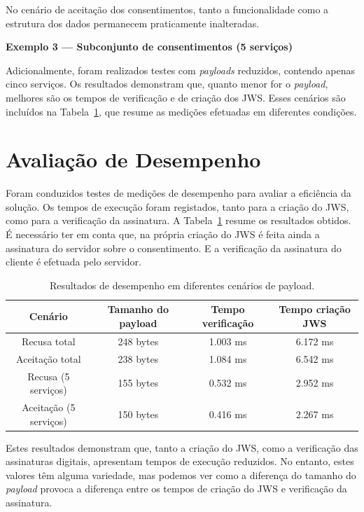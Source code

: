 No cenário de aceitação dos consentimentos, tanto a funcionalidade como a estrutura dos dados permanecem praticamente inalteradas.

\textbf{Exemplo 3 — Subconjunto de consentimentos (5 serviços)}

Adicionalmente, foram realizados testes com \textit{payloads} reduzidos, contendo apenas cinco serviços.
Os resultados demonstram que, quanto menor for o \textit{payload}, melhores são os tempos de verificação e de criação dos JWS.
Esses cenários são incluídos na Tabela~\ref{tab:performance}, que resume as medições efetuadas em diferentes condições.

\section{Avaliação de Desempenho}

Foram conduzidos testes de medições de desempenho para avaliar a eficiência da solução. Os tempos de execução foram registados, tanto para a criação do JWS, como para a verificação da assinatura. A Tabela~\ref{tab:performance} resume os resultados obtidos.
É necessário ter em conta que, na própria criação do JWS é feita ainda a assinatura do servidor sobre o consentimento. E a verificação da assinatura do cliente é efetuada pelo servidor.

\begin{table}[h]
    \centering
    \caption{Resultados de desempenho em diferentes cenários de payload.}
    \label{tab:performance}
    \begin{tabular}{|c|c|c|c|}
        \hline
        \textbf{Cenário} & \textbf{Tamanho do payload} & \textbf{Tempo verificação} & \textbf{Tempo criação JWS} \\ \hline
        Recusa total   & 248 bytes & 1.003 ms & 6.172 ms \\ \hline
        Aceitação total & 238 bytes & 1.084 ms & 6.542 ms \\ \hline
        Recusa (5 serviços) & 155 bytes & 0.532 ms & 2.952 ms \\ \hline
        Aceitação (5 serviços) & 150 bytes & 0.416 ms & 2.267 ms \\ \hline
    \end{tabular}
\end{table}

Estes resultados demonstram que, tanto a criação do JWS, como a verificação das assinaturas digitais, apresentam tempos de execução reduzidos. No entanto, estes valores têm alguma variedade, mas podemos ver como a diferença do tamanho do \textit{payload} provoca a diferença entre os tempos de criação do JWS e verificação da assinatura.

